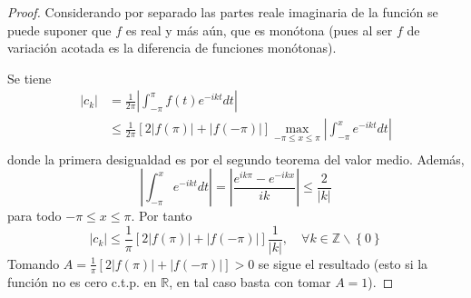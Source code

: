 \documentclass[12pt]{report}
\newcounter{it}
\theoremstyle{largebreak}
\renewcommand{\leq}{\ensuremath{\leqslant}}
\newcommand\abs[1]{\ensuremath{\left|#1\right|}}
\begin{document}
    \begin{proof}
        Considerando por separado las partes reale imaginaria de la función se puede suponer que $f$ es real y más aún, que es monótona (pues al ser $f$ de variación acotada es la diferencia de funciones monótonas).

        Se tiene
        \begin{equation*}
            \begin{split}
                \abs{c_k}&=\frac{1}{2\pi}\abs{\int_{-\pi}^\pi f(t)e^{ -ikt}dt}\\
                &\leq\frac{1}{2\pi}\left[2\abs{f(\pi)}+\abs{f(-\pi)} \right]\max_{ -\pi\leq x\leq\pi}\abs{\int_{ -\pi}^x e^{ -ikt}dt}\\
            \end{split}
        \end{equation*}
        donde la primera desigualdad es por el segundo teorema del valor medio. Además,
        \begin{equation*}
            \abs{\int_{ -\pi}^x e^{ -ikt}dt}=\abs{\frac{e^{ ik\pi}-e^{- ikx}}{ik}}\leq\frac{2}{\abs{k}}
        \end{equation*}
        para todo $-\pi\leq x\leq\pi$. Por tanto
        \begin{equation*}
            \abs{c_k}\leq\frac{1}{\pi}[2\abs{f(\pi)}+\abs{f(-\pi)}]\frac{1}{\abs{k}},\quad\forall k\in\mathbb{Z}\backslash\left\{0\right\}
        \end{equation*}
        Tomando $A=\frac{1}{\pi}[2\abs{f(\pi)}+\abs{f(-\pi)}]>0$ se sigue el resultado (esto si la función no es cero c.t.p. en $\mathbb{R}$, en tal caso basta con tomar $A=1$).
    \end{proof}
\end{document}
